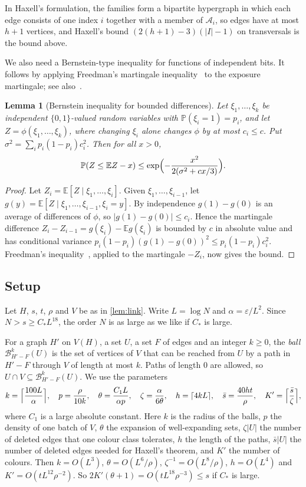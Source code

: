 \documentclass[11pt]{article}
\newtheorem{lemma}[theorem]{Lemma}
\theoremstyle{definition}
\theoremstyle{remark}
\numberwithin{equation}{section}
\numberwithin{figure}{section}
\numberwithin{table}{section}
\newcommand{\eps}{\varepsilon}
\newcommand{\E}{\mathbb{E}}
\renewcommand{\Pr}{\mathbb{P}}
\newcommand{\cA}{\mathcal{A}}
\newcommand{\cB}{\mathcal{B}}
\begin{document}
In Haxell's formulation, the families form a bipartite hypergraph in which each
edge consists of one index $i$ together with a member of $\cA_i$, so edges have
at most $h+1$ vertices, and Haxell's bound $(2(h+1)-3)(|I|-1)$ on transversals
is the bound above.

We also need a Bernstein-type inequality for functions of independent bits.
It follows by applying Freedman's martingale inequality~\cite{Fre} to the
exposure martingale; see also~\cite{McD}.

\begin{lemma}[Bernstein inequality for bounded differences]\label{lem:freedman}
Let $\xi_1,\dots,\xi_k$ be independent $\{0,1\}$-valued random variables with
$\Pr(\xi_i=1)=p_i$, and let $Z=\phi(\xi_1,\dots,\xi_k)$, where changing $\xi_i$
alone changes $\phi$ by at most $c_i\le c$. Put
$\sigma^2=\sum_ip_i(1-p_i)c_i^2$. Then for all $x>0$,
\[
\Pr(Z\le\E Z-x)\le\exp\Bigl(-\frac{x^2}{2(\sigma^2+cx/3)}\Bigr).
\]
\end{lemma}

\begin{proof}
Let $Z_i=\E[Z\mid\xi_1,\dots,\xi_i]$. Given $\xi_1,\dots,\xi_{i-1}$, let
$g(y)=\E[Z\mid\xi_1,\dots,\xi_{i-1},\xi_i=y]$. By independence $g(1)-g(0)$ is
an average of differences of $\phi$, so $|g(1)-g(0)|\le c_i$. Hence the
martingale difference $Z_i-Z_{i-1}=g(\xi_i)-\E g(\xi_i)$ is bounded by $c$ in
absolute value and has conditional variance
$p_i(1-p_i)(g(1)-g(0))^2\le p_i(1-p_i)c_i^2$. Freedman's inequality~\cite{Fre},
applied to the martingale $-Z_i$, now gives the bound.
\end{proof}

\subsection*{Setup}

Let $H$, $s$, $t$, $\rho$ and $V$ be as in \cref{lem:link}. Write $L=\log N$ and $\alpha=\eps/L^2$. Since
$N>s\ge C_*L^{18}$, the order $N$ is as large as we like if $C_*$ is large.

For a graph $H'$ on $V(H)$, a set $U$, a set $F$ of edges and an integer
$k\ge0$, the \emph{ball} $\cB^k_{H'-F}(U)$ is the set of vertices of $V$ that
can be reached from $U$ by a path in $H'-F$ through $V$ of length at most $k$.
Paths of length $0$ are allowed, so $U\cap V\subseteq\cB^k_{H'-F}(U)$. We use
the parameters
\[
k=\Bigl\lceil\frac{100L}\alpha\Bigr\rceil,\quad p=\frac\rho{10k},\quad
\theta=\frac{C_1L}{\alpha p},\quad \zeta=\frac\alpha{6\theta},\quad
h=\lceil4kL\rceil,\quad \bar s=\frac{40ht}\rho,\quad
K'=\Bigl\lceil\frac{\bar s}{\zeta}\Bigr\rceil,
\]
where $C_1$ is a large absolute constant. Here $k$ is the radius of the balls,
$p$ the density of one batch of $V$, $\theta$ the expansion of well-expanding
sets, $\zeta|U|$ the number of deleted edges that one colour class tolerates,
$h$ the length of the paths, $\bar s|U|$ the number of deleted edges needed for
Haxell's theorem, and $K'$ the number of colours. Then $k=O(L^3)$,
$\theta=O(L^6/\rho)$, $\zeta^{-1}=O(L^8/\rho)$, $h=O(L^4)$ and
$K'=O(tL^{12}\rho^{-2})$. So $2K'(\theta+1)=O(tL^{18}\rho^{-3})\le s$ if $C_*$
is large.
\end{document}
